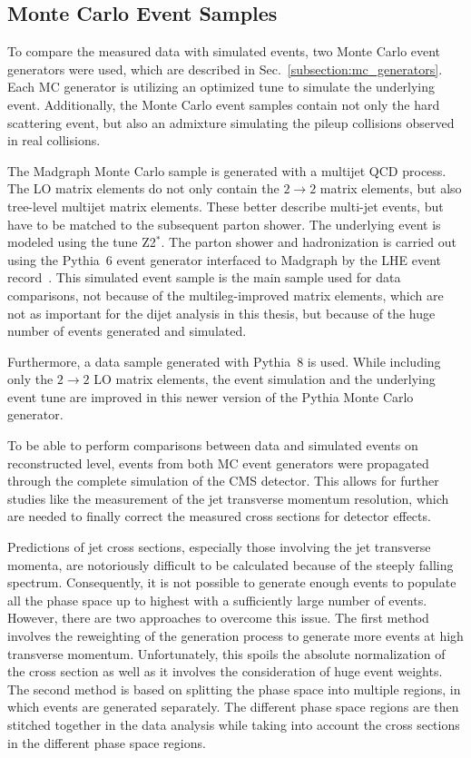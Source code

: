 \subsection{Monte Carlo Event Samples}

To compare the measured data with simulated events, two
Monte Carlo event generators were used, which are described in
Sec.~\ref{subsection:mc_generators}. Each MC generator is utilizing an optimized
tune to simulate the underlying event. Additionally, the Monte Carlo event samples
contain not only the hard scattering event, but also an admixture
simulating the pileup collisions observed in real collisions.

The Madgraph Monte Carlo sample is generated with a multijet QCD
process. The LO matrix elements do not only contain the $2
\rightarrow 2$ matrix elements, but also tree-level multijet matrix elements. These better
describe multi-jet events, but have to be matched to the subsequent parton
shower. The underlying event is modeled using the tune Z2$^*$. The parton shower
and hadronization is carried out using the Pythia~6 event generator interfaced
to Madgraph by the LHE event record~\cite{Alwall:2006yp}. This simulated event
sample is the main sample used for data comparisons, not because of the
multileg-improved matrix elements, which are not as important for the dijet
analysis in this thesis, but because of the huge number of events generated and simulated.

Furthermore, a data sample generated with Pythia~8 is used. While including only the $2
\rightarrow 2$ LO matrix elements, the event simulation and the underlying event
tune are improved in this newer version of the Pythia Monte Carlo generator.

To be able to perform comparisons between data and simulated events on
reconstructed level, events from both MC event generators were propagated
through the complete simulation of the CMS detector. This allows for further
studies like the measurement of the jet transverse momentum resolution, which are
needed to finally correct the measured cross sections for detector effects.

Predictions of jet cross sections, especially those involving the jet transverse
momenta, are notoriously difficult to be calculated because of the steeply
falling spectrum. Consequently, it is not possible to generate enough events to
populate all the phase space up to highest \pt with a sufficiently large
number of events. However, there are two approaches to overcome this issue.
The first method involves the reweighting of the generation process to generate
more events at high transverse momentum. Unfortunately, this spoils the absolute
normalization of the cross section as well as it involves the consideration of
huge event weights. The second method is based on splitting the phase space into
multiple regions, in which events are generated separately. The different phase
space regions are then stitched together in the data analysis while taking
into account the cross sections in the different phase space regions. 

